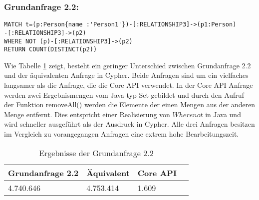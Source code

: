 \subsubsection{Grundanfrage 2.2:}
\begin{Verbatim}[frame=single]
MATCH t=(p:Person{name :'Person1'})-[:RELATIONSHIP3]->(p1:Person)
-[:RELATIONSHIP3]->(p2)
WHERE NOT (p)-[:RELATIONSHIP3]->(p2) 
RETURN COUNT(DISTINCT(p2))
\end{Verbatim} 
 Wie Tabelle \ref{tab:Query2_2} zeigt, besteht ein geringer Unterschied zwischen Grundanfrage 2.2 und der äquivalenten Anfrage in Cypher. Beide Anfragen sind um ein vielfaches langsamer als die Anfrage, die die Core API verwendet. In der Core API Anfrage werden zwei Ergebnismengen vom Java-typ Set gebildet und durch den Aufruf der Funktion removeAll() werden die Elemente der einen Mengen aus der anderen Menge entfernt. Dies entspricht einer Realisierung von $Where not$ in Java und wird schneller ausgeführt als der Ausdruck in Cypher. Alle drei Anfragen besitzen im Vergleich zu vorangegangen Anfragen eine extrem hohe Bearbeitungszeit.
\FloatBarrier
\begin{table}[h]
	\centering
		\begin{tabular}{ |p{3cm}|p{3cm}|p{3cm}|p{3cm}|  }
			\hline
			Grundanfrage 2.2 & Äquivalent&Core API\\
			\hline
			4.740.646    & 4.753.414 &  1.609\\
			\hline
		\end{tabular}
		\caption{Ergebnisse der Grundanfrage 2.2}
		\label{tab:Query2_2}
\end{table}
\FloatBarrier
